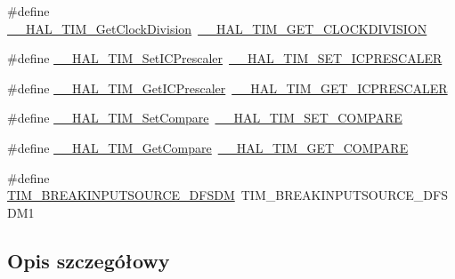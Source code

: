 \begin{DoxyCompactItemize}
\item 
\#define \hyperlink{group___h_a_l___t_i_m___aliased___macros_gaaf835e3864f2ba2e2026d417ad0d5e40}{\+\_\+\+\_\+\+H\+A\+L\+\_\+\+T\+I\+M\+\_\+\+Get\+Clock\+Division}~\hyperlink{group___t_i_m___exported___macros_gae6bc91bb5940bce52828c690f24001b8}{\+\_\+\+\_\+\+H\+A\+L\+\_\+\+T\+I\+M\+\_\+\+G\+E\+T\+\_\+\+C\+L\+O\+C\+K\+D\+I\+V\+I\+S\+I\+ON}
\item 
\#define \hyperlink{group___h_a_l___t_i_m___aliased___macros_ga1cb3c9854441539ebe076fba62c36d22}{\+\_\+\+\_\+\+H\+A\+L\+\_\+\+T\+I\+M\+\_\+\+Set\+I\+C\+Prescaler}~\hyperlink{group___t_i_m___exported___macros_gaeb106399b95ef02cec502f58276a0e92}{\+\_\+\+\_\+\+H\+A\+L\+\_\+\+T\+I\+M\+\_\+\+S\+E\+T\+\_\+\+I\+C\+P\+R\+E\+S\+C\+A\+L\+ER}
\item 
\#define \hyperlink{group___h_a_l___t_i_m___aliased___macros_gae8d82e4e04e81f7a023a45b73c9705b7}{\+\_\+\+\_\+\+H\+A\+L\+\_\+\+T\+I\+M\+\_\+\+Get\+I\+C\+Prescaler}~\hyperlink{group___t_i_m___exported___macros_gabfeec6b3c67a5747c7dbd20aff61d8e2}{\+\_\+\+\_\+\+H\+A\+L\+\_\+\+T\+I\+M\+\_\+\+G\+E\+T\+\_\+\+I\+C\+P\+R\+E\+S\+C\+A\+L\+ER}
\item 
\#define \hyperlink{group___h_a_l___t_i_m___aliased___macros_ga03feb77e8c86f3563d671c1ec2439e76}{\+\_\+\+\_\+\+H\+A\+L\+\_\+\+T\+I\+M\+\_\+\+Set\+Compare}~\hyperlink{group___t_i_m___exported___macros_ga300d0c9624c3b072d3afeb7cef639b66}{\+\_\+\+\_\+\+H\+A\+L\+\_\+\+T\+I\+M\+\_\+\+S\+E\+T\+\_\+\+C\+O\+M\+P\+A\+RE}
\item 
\#define \hyperlink{group___h_a_l___t_i_m___aliased___macros_ga6c5f81acbdba730e0cd6a67f06e97de2}{\+\_\+\+\_\+\+H\+A\+L\+\_\+\+T\+I\+M\+\_\+\+Get\+Compare}~\hyperlink{group___t_i_m___exported___macros_gaa40722f56910966e1da5241b610eed84}{\+\_\+\+\_\+\+H\+A\+L\+\_\+\+T\+I\+M\+\_\+\+G\+E\+T\+\_\+\+C\+O\+M\+P\+A\+RE}
\item 
\#define \hyperlink{group___h_a_l___t_i_m___aliased___macros_ga1e28079e8964fba6a2b3e0484843ddc4}{T\+I\+M\+\_\+\+B\+R\+E\+A\+K\+I\+N\+P\+U\+T\+S\+O\+U\+R\+C\+E\+\_\+\+D\+F\+S\+DM}~T\+I\+M\+\_\+\+B\+R\+E\+A\+K\+I\+N\+P\+U\+T\+S\+O\+U\+R\+C\+E\+\_\+\+D\+F\+S\+D\+M1
\end{DoxyCompactItemize}


\subsection{Opis szczegółowy}


